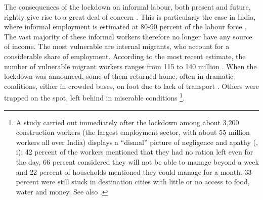 \documentclass[a4paper, 11pt, onecolumn]{article}
\begin{document}
The consequences of the lockdown on informal labour, both present and future, rightly give rise to a great deal of concern \citep{ILO2020, Majid2020}. This is particularly the case in India, where informal employment is estimated at 80-90 percent of the labour force \citep{ILO2016, Harriss-White2020, Srivastava2020}. The vast majority of these informal workers therefore no longer have any source of income. The most vulnerable are internal migrants, who account for a considerable share of employment. According to the most recent estimate, the number of vulnerable migrant workers ranges from 115 to 140 million \citep{Srivastava2020}. When the lockdown was announced, some of them returned home, often in dramatic conditions, either in crowded buses, on foot due to lack of transport \citep{Bhagat2020, Mukho2020, Picherit2020}. Others were trapped on the spot, left behind in miserable conditions \citep{Sahas2020}\footnote{A study carried out immediately after the lockdown among about 3,200 construction workers (the largest employment sector, with about 55 million workers all over India) displays a “dismal” picture of negligence and apathy (\cite{Sahas2020}, i): 42 percent of the workers mentioned that they had no ration left even for the day, 66 percent considered they will not be able to manage beyond a week and 22 percent of households mentioned they could manage for a month. 33 percent were still stuck in destination cities with little or no access to food, water and money. See also \cite{Bercegol2020}.}.  
\end{document}
